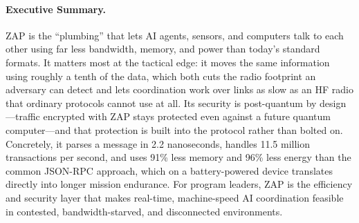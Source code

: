 \documentclass[11pt,letterpaper]{article}
\begin{document}
\makecover

\begin{abstract}
We present ZAP (Zero-copy Application Protocol), a high-performance binary serialization and RPC framework achieving 2.2~ns parse latency with zero memory allocations, 11.5 million transactions per second end-to-end, and 91\% memory reduction compared to JSON-RPC. ZAP provides two production implementations---Rust (AI agent communication, MCP gateway bridging) and Go (blockchain consensus wire protocol, VM-to-VM messaging)---sharing a common wire format with 16-byte headers and 8-byte aligned structs for direct pointer-arithmetic reads from network buffers. The protocol includes native post-quantum transport security (ML-KEM-768 + ML-DSA-65 hybrid handshake), decentralized identity via W3C DIDs derived from lattice public keys, distributed agent consensus with threshold voting, and mDNS-based ad-hoc network discovery. We analyze ZAP's suitability for contested electromagnetic environments, bandwidth-limited tactical links, GPU cluster coordination, and edge AI agent orchestration, demonstrating 96\% energy reduction and 30$\times$ throughput improvement over standard protocols under identical network conditions.
\end{abstract}

\paragraph{Executive Summary.}
ZAP is the ``plumbing'' that lets AI agents, sensors, and computers talk to each other using far less bandwidth, memory, and power than today's standard formats. It matters most at the tactical edge: it moves the same information using roughly a tenth of the data, which both cuts the radio footprint an adversary can detect and lets coordination work over links as slow as an HF radio that ordinary protocols cannot use at all. Its security is post-quantum by design---traffic encrypted with ZAP stays protected even against a future quantum computer---and that protection is built into the protocol rather than bolted on. Concretely, it parses a message in 2.2 nanoseconds, handles 11.5 million transactions per second, and uses 91\% less memory and 96\% less energy than the common JSON-RPC approach, which on a battery-powered device translates directly into longer mission endurance. For program leaders, ZAP is the efficiency and security layer that makes real-time, machine-speed AI coordination feasible in contested, bandwidth-starved, and disconnected environments.
\end{document}
